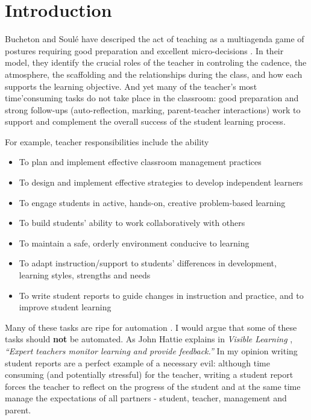 \documentclass[10pt]{article}
\begin{document}
\section{Introduction}

Bucheton and Soulé have descriped the act of teaching as a multiagenda game of postures requiring good preparation and excellent micro-decisions \cite{BS09}. In their model, they identify the crucial roles of the teacher in controling the cadence, the atmosphere, the scaffolding and the relationships during the class, and how each supports the learning objective. And yet many of the teacher's most time'consuming tasks do not take place in the classroom: good preparation and strong follow-ups (auto-reflection, marking, parent-teacher interactions) work to support and complement the overall success of the student learning process.

For example, teacher responsibilities include the ability
\begin{itemize}
\item To plan and implement effective classroom management practices
\item To design and implement effective strategies to develop independent learners
\item To engage students in active, hands-on, creative problem-based learning
\item To build students’ ability to work collaboratively with others
\item To maintain a safe, orderly environment conducive to learning
\item To adapt instruction/support to students’ differences in development, learning styles, strengths and needs
\item To write student reports to guide changes in instruction and practice, and to improve student learning
\end{itemize}

Many of these tasks are ripe for automation \cite{Swei15}. I would argue that some of these tasks should \textbf{not} be automated. As John Hattie explains in \emph{Visible Learning} \cite{Hat12}, \emph{``Expert teachers monitor learning and provide feedback.''} In my opinion writing student reports are a perfect example of a necessary evil: although time consuming (and potentially stressful) for the teacher, writing a student report forces the teacher to reflect on the progress of the student and at the same time manage the expectations of all partners - student, teacher, management and parent.
\end{document}
